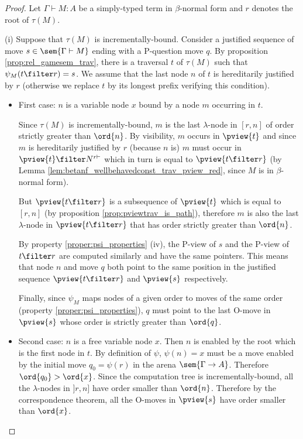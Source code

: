 \begin{proof}
Let $\Gamma \vdash M : A$ be a simply-typed term in $\beta$-normal
form and $r$ denotes the root of $\tau(M)$.

\noindent (i) Suppose that $\tau(M)$ is incrementally-bound.
Consider a justified sequence of move $s \in \sem{\Gamma \vdash M}$
ending with a P-question move $q$. By proposition \ref{prop:rel_gamesem_trav},
there is a traversal $t$ of $\tau(M)$ such that $\psi_M (t\filter r) = s$. We assume that the last node $n$ of $t$ is
hereditarily justified by $r$ (otherwise we replace $t$ by its
longest prefix verifying this condition).
\begin{itemize}
\item First case: $n$ is a variable node $x$ bound by a node $m$ occurring in $t$.

Since $\tau(M)$ is incrementally-bound, $m$ is the last
$\lambda$-node in $[r,n]$ of order strictly greater than
$\ord{n}$. By visibility, $m$ occurs in $\pview{t}$ and since
$m$ is hereditarily justified by $r$ (because $n$ is) $m$ must
occur in $\pview{t} \filter N^{r \vdash}$ which in turn is equal
to $\pview{t \filter r}$ (by Lemma
\ref{lem:betanf_wellbehavedconst_trav_pview_red}, since $M$ is
in $\beta$-normal form).



But $\pview{t \filter r}$ is a subsequence of
$\pview{t}$ which is equal to $[r,n]$ (by proposition \ref{prop:pviewtrav_is_path}), therefore $m$ is also the last $\lambda$-node in $\pview{t \filter  r}$ that has order strictly greater
than $\ord{n}$.

By property \ref{proper:psi_properties} (iv), the P-view of $s$ and
the P-view of $t \filter r$ are computed similarly and
have the same pointers. This means that node $n$ and  move $q$ both
point to the same position in the justified sequence
$\pview{t\filter r}$ and $\pview{s}$ respectively.

Finally, since $\psi_M$ maps nodes of a given order to moves of the
same order (property \ref{proper:psi_properties}), $q$ must
point to the last O-move in $\pview{s}$ whose order is strictly
greater than $\ord{q}$.


\item  Second case: $n$ is a free variable node $x$. Then $n$ is enabled by the root which is the first node in $t$.
By definition of $\psi$, $\psi(n) = x$ must be a move enabled
by the initial move $q_0 = \psi(r)$ in the arena $\sem{\Gamma
\rightarrow A}$. Therefore $\ord{q_0} > \ord{x}$. Since the
computation tree is incrementally-bound, all the $\lambda$-nodes in
$]r,n]$ have order smaller than $\ord{n}$. Therefore by the
correspondence theorem, all the O-moves in $\pview{s}$ have order
smaller than $\ord{x}$.
\end{itemize}


\end{proof}
